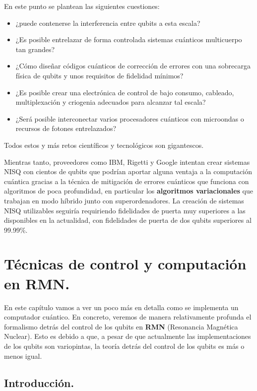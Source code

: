 En este punto se plantean las siguientes cuestiones:
\begin{itemize}
\item ¿puede contenerse la interferencia entre qubits a esta escala? 
\item ¿Es posible entrelazar de forma controlada sistemas cuánticos multicuerpo tan grandes? 
\item ¿Cómo diseñar códigos cuánticos de corrección de errores con una sobrecarga física de qubits y unos requisitos de fidelidad mínimos? 
\item ¿Es posible crear una electrónica de control de bajo consumo, cableado, multiplexación y criogenia adecuados para alcanzar tal escala?
\item ¿Será posible interconectar varios procesadores cuánticos con microondas o recursos de fotones entrelazados? 
\end{itemize}
Todos estos y más retos científicos y tecnológicos son gigantescos.

Mientras tanto, proveedores como IBM, Rigetti y Google intentan crear sistemas NISQ con cientos de qubits que podrían aportar alguna ventaja a la computación cuántica gracias a la técnica de mitigación de errores cuánticos que funciona con algoritmos de poca profundidad, en particular los \textbf{algoritmos variacionales} que trabajan en modo híbrido junto con superordenadores. La creación de sistemas NISQ utilizables seguiría requiriendo fidelidades de puerta muy superiores a las disponibles en la actualidad, con fidelidades de puerta de dos qubits superiores al 99.99\%.









\chapter{Técnicas de control y computación en RMN.}

En este capítulo vamos a ver un poco más en detalla como se implementa un computador cuántico. En concreto, veremos de manera relativamente profunda el formalismo detrás del control de los qubits en \textbf{RMN} (Resonancia Magnética Nuclear). Esto es debido a que, a pesar de que actualmente las implementaciones de los qubits son variopintas, la teoría detrás del control de los qubits es más o menos igual. 

	\section{Introducción.}

